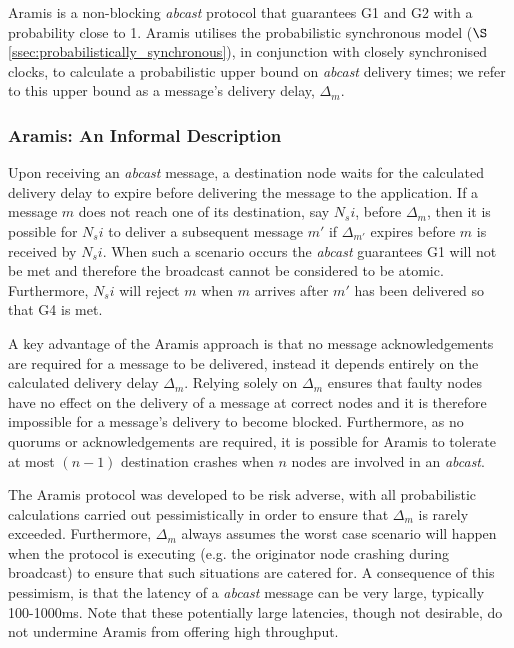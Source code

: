     \textsf{Aramis} is a non-blocking \emph{abcast} protocol that guarantees G1 and G2 with a probability close to 1.  \textsf{Aramis} utilises the probabilistic synchronous model ($\S$ \ref{ssec:probabilistically_synchronous}), in conjunction with closely synchronised clocks, to calculate a probabilistic upper bound on \emph{abcast} delivery times; we refer to this upper bound as a message's delivery delay, $\Delta_m$.  
    
    \subsubsection*{\textsf{Aramis: } An Informal Description}
    Upon receiving an \emph{abcast} message, a destination node waits for the calculated delivery delay to expire before delivering the message to the application.  If a message $m$ does not reach one of its destination, say $N_si$, before $\Delta_m$, then it is possible for $N_si$ to deliver a subsequent message $m'$ if $\Delta_{m'}$ expires before $m$ is received by $N_si$.  When such a scenario occurs the \emph{abcast} guarantees G1 will not be met and therefore the broadcast cannot be considered to be atomic.  Furthermore, $N_si$ will reject $m$ when $m$ arrives after $m'$ has been delivered so that G4 is met.  
    
    A key advantage of the \textsf{Aramis} approach is that no message acknowledgements are required for a message to be delivered, instead it depends entirely on the calculated delivery delay $\Delta_m$.  Relying solely on $\Delta_m$ ensures that faulty nodes have no effect on the delivery of a message at correct nodes and it is therefore impossible for a message's delivery to become blocked.  Furthermore, as no quorums or acknowledgements are required, it is possible for  \textsf{Aramis} to tolerate at most $(n - 1)$ destination crashes when $n$ nodes are involved in an \emph{abcast}.  
    
    The \textsf{Aramis} protocol was developed to be risk adverse, with all probabilistic calculations carried out pessimistically in order to ensure that $\Delta_m$ is rarely exceeded.  Furthermore, $\Delta_m$ always assumes the worst case scenario will happen when the protocol is executing (e.g. the originator node crashing during broadcast) to ensure that such situations are catered for.  A consequence of this pessimism, is that the latency of a \emph{abcast} message can be very large, typically 100-1000ms.  Note that these potentially large latencies, though not desirable, do not undermine \textsf{Aramis} from offering high throughput.  
    
